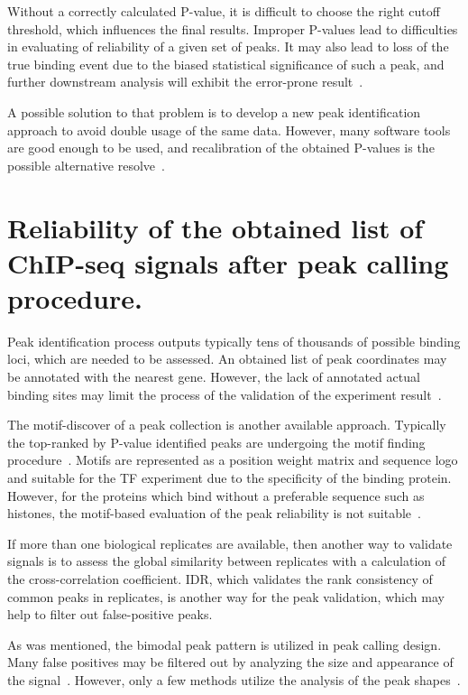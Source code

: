 Without a correctly calculated P-value, it is difficult to choose the right cutoff threshold, which influences the final results. 
Improper P-values lead to difficulties in evaluating of reliability of a given set of peaks.
It may also lead to loss of the true binding event due to the biased statistical significance of such a peak, and further downstream analysis will exhibit the error-prone result~\cite{chitpin2019recap}. 

A possible solution to that problem is to develop a new peak identification approach to avoid double usage of the same data. 
However, many software tools are good enough to be used, and recalibration of the obtained P-values is the possible alternative resolve~\cite{chitpin2019recap}.

\section{Reliability of the obtained list of ChIP-seq signals after peak calling procedure.}

Peak identification process outputs typically tens of thousands of possible binding loci, which are needed to be assessed. 
An obtained list of peak coordinates may be annotated with the nearest gene. 
However, the lack of annotated actual binding sites may limit the process of the validation of the experiment result~\cite{nakato2017recent}.

The motif-discover of a peak collection is another available approach. 
Typically the top-ranked by P-value identified peaks are undergoing the motif finding procedure~\cite{bailey2011dreme}.
Motifs are represented as a position weight matrix and sequence logo and suitable for the TF experiment due to the specificity of the binding protein.
However, for the proteins which bind without a preferable sequence such as histones, the motif-based evaluation of the peak reliability is not suitable~\cite{nakato2017recent}. 

If more than one biological replicates are available, then another way to validate signals is to assess the global similarity between replicates with a calculation of the cross-correlation coefficient. 
IDR, which validates the rank consistency of common peaks in replicates, is another way for the peak validation, which may help to filter out false-positive peaks. 

As  was mentioned, the bimodal peak pattern is utilized in peak calling design. 
Many false positives may be filtered out by analyzing the size and appearance of the signal~\cite{rye2011manually}. 
However, only a few methods utilize the analysis of the peak shapes~\cite{hower2011shape, wu2014polyapeak}.



